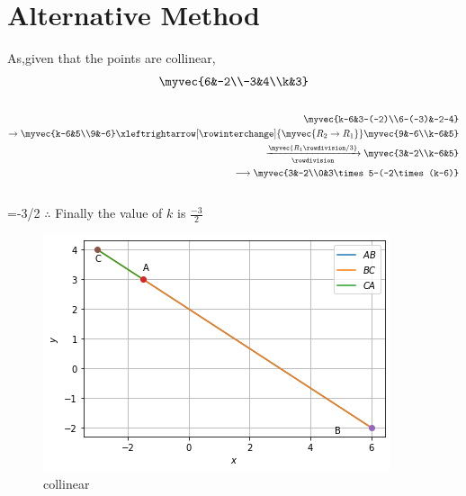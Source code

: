 \documentclass[journal,12pt,twocolumn]{IEEEtran}
\begin{document}
\section{Alternative Method}
As,given that the points are collinear,
\begin{align}
\myvec{6&-2\\-3&4\\k&3}
\end{align}
\begin{align*}\\
\myvec{k-6&3-(-2)\\6-(-3)&-2-4}\\
\rightarrow
\myvec{k-6&5\\9&-6}
\xleftrightarrow[\rowinterchange]{\myvec{R_2\rightarrow R_1}}
\myvec{9&-6\\k-6&5}\\
\xrightarrow[\rowdivision]{\myvec{R_1\rowdivision/3}}
\myvec{3&-2\\k-6&5}\\
\longrightarrow
\myvec{3&-2\\0&3\times5-(-2\times(k-6)}
\end{align*}
\\ 
={-3/2}
 $\therefore$ Finally the value of $k$ is $\frac{-3}{2}$
 
 
 \begin{figure}[h!]
\includegraphics[width=\linewidth]{Collinear.png}
  \caption{collinear}
  \label{collinear points}
\end{figure}
%
\end{document}
